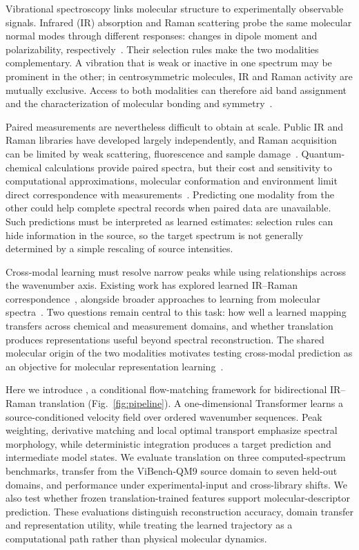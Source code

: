 Vibrational spectroscopy links molecular structure to experimentally observable signals. Infrared (IR) absorption and Raman scattering probe the same molecular normal modes through different responses: changes in dipole moment and polarizability, respectively~\cite{Hashimoto_2019,Chang_2022,Meng_2025}. Their selection rules make the two modalities complementary. A vibration that is weak or inactive in one spectrum may be prominent in the other; in centrosymmetric molecules, IR and Raman activity are mutually exclusive. Access to both modalities can therefore aid band assignment and the characterization of molecular bonding and symmetry~\cite{yuan2025qme14s,wang2025diffspectra,wang2025molspectra}.

Paired measurements are nevertheless difficult to obtain at scale. Public IR and Raman libraries have developed largely independently, and Raman acquisition can be limited by weak scattering, fluorescence and sample damage~\cite{Chan_2005,Sasmaz_2015,Wei_2015,Shipp_2017}. Quantum-chemical calculations provide paired spectra, but their cost and sensitivity to computational approximations, molecular conformation and environment limit direct correspondence with measurements~\cite{zou2023deep,liang2025dataset,Laury_2012,Barone_2014,Bloino_2015}. Predicting one modality from the other could help complete spectral records when paired data are unavailable. Such predictions must be interpreted as learned estimates: selection rules can hide information in the source, so the target spectrum is not generally determined by a simple rescaling of source intensities.

Cross-modal learning must resolve narrow peaks while using relationships across the wavenumber axis. Existing work has explored learned IR--Raman correspondence~\cite{yang2024cross}, alongside broader approaches to learning from molecular spectra~\cite{lu2025vib2mol,cai2025deep,kanakala2024spectra,alberts2025setting,su2025language}. Two questions remain central to this task: how well a learned mapping transfers across chemical and measurement domains, and whether translation produces representations useful beyond spectral reconstruction. The shared molecular origin of the two modalities motivates testing cross-modal prediction as an objective for molecular representation learning~\cite{zhu2026spectrogen}.

Here we introduce \mname, a conditional flow-matching framework for bidirectional IR--Raman translation (Fig.~\ref{fig:pipeline}). A one-dimensional Transformer learns a source-conditioned velocity field over ordered wavenumber sequences. Peak weighting, derivative matching and local optimal transport emphasize spectral morphology, while deterministic integration produces a target prediction and intermediate model states. We evaluate translation on three computed-spectrum benchmarks, transfer from the ViBench-QM9 source domain to seven held-out domains, and performance under experimental-input and cross-library shifts. We also test whether frozen translation-trained features support molecular-descriptor prediction. These evaluations distinguish reconstruction accuracy, domain transfer and representation utility, while treating the learned trajectory as a computational path rather than physical molecular dynamics.

